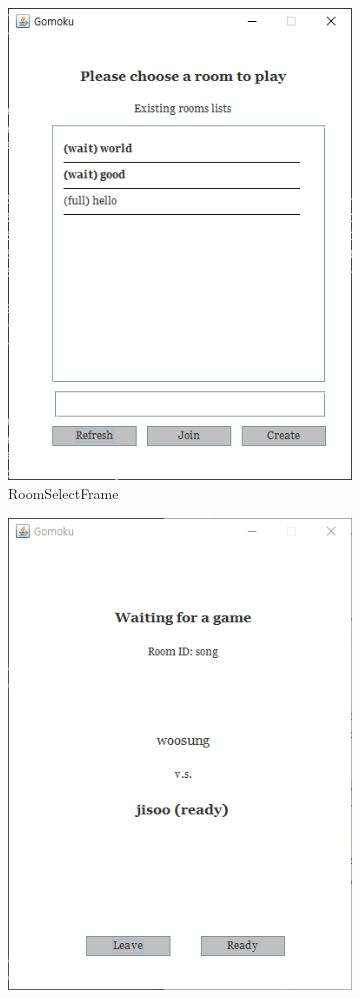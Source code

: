 \documentclass[a4paper, 10pt]{article}
\begin{document}
\begin{figure}[h]
\begin{subfigure}{.24\textwidth}
    \includegraphics[width=.9\linewidth]{resource/room_search}
    \caption{RoomSelectFrame}
    \label{fig:room_select_frame}
  \end{subfigure}
  \begin{subfigure}{.24\textwidth}
    \centering
    \includegraphics[width=.9\linewidth]{resource/room}

\end{subfigure}
\end{figure}
\end{document}
